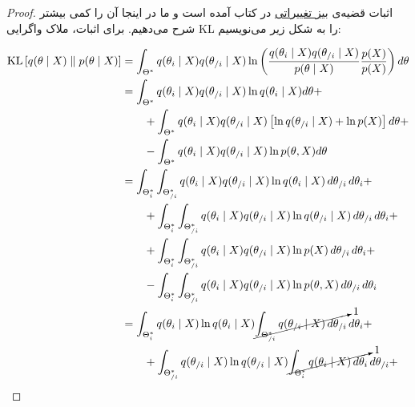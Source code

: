 \begin{proof}

اثبات قضیه‌ی
\hyperref[thm:VarBayeseTheorem]{بیز تغییراتی}
در کتاب
\cite{VBMethodsInSignal}
آمده است و ما در اینجا آن را کمی بیشتر شرح می‌دهیم. برای اثبات، ملاک واگرایی
KL
را به شکل زیر می‌نویسیم:


\allowdisplaybreaks
\begin{align*}
\KL{\AppCProb{\theta}{X}}{\TrueCProb{\theta}{X}}
&= \int_{\Theta^*} \AppCProb{\theta_i}{X} \AppCProb{\theta_{/i}}{X} \ln \left( \frac{
		\AppCProb{\theta_i}{X} \AppCProb{\theta_{/i}}{X}
	}{
		\TrueCProb{\theta}{X}
	} \frac{ \TrueProb{X} }{ \TrueProb{X} }
\right) d\theta																										\\
	&= \int_{\Theta^*} \AppCProb{\theta_i}{X} \AppCProb{\theta_{/i}}{X} \ln \AppCProb{\theta_i}{X} d\theta +		\\
		& \qquad + \int_{\Theta^*} \AppCProb{\theta_i}{X} \AppCProb{\theta_{/i}}{X} \left[
			\ln \AppCProb{\theta_{/i}}{X} + \ln \TrueProb{X}
		\right] d\theta +																							\\
		& \qquad - \int_{\Theta^*} \AppCProb{\theta_i}{X} \AppCProb{\theta_{/i}}{X} \ln \TrueProb{\theta, X} d\theta		\\
	&= \int_{\Theta_i^*} \int_{\Theta_{/i}^*}
		\AppCProb{\theta_i}{X} \AppCProb{\theta_{/i}}{X} \ln \AppCProb{\theta_i}{X}
	\,d\theta_{/i} \,d\theta_i +																					\\
		& \qquad + \int_{\Theta_i^*} \int_{\Theta_{/i}^*}
			\AppCProb{\theta_i}{X} \AppCProb{\theta_{/i}}{X} \ln \AppCProb{\theta_{/i}}{X}
		\,d\theta_{/i} \,d\theta_i +																				\\
		& \qquad + \int_{\Theta_i^*} \int_{\Theta_{/i}^*}
			\AppCProb{\theta_i}{X} \AppCProb{\theta_{/i}}{X} \ln \TrueProb{X}
		\,d\theta_{/i} \,d\theta_i +																				\\
		& \qquad - \int_{\Theta_i^*} \int_{\Theta_{/i}^*}
			\AppCProb{\theta_i}{X} \AppCProb{\theta_{/i}}{X} \ln \TrueProb{\theta, X}
		\,d\theta_{/i} \,d\theta_i																					\\
	&= \int_{\Theta_i^*} \AppCProb{\theta_i}{X} \ln \AppCProb{\theta_i}{X}
		\cancelto{1}{\int_{\Theta_{/i}^*} \AppCProb{\theta_{/i}}{X} \,d\theta_{/i}}
	\,d\theta_i +																									\\
		& \qquad + \int_{\Theta_{/i}^*} \AppCProb{\theta_{/i}}{X} \ln \AppCProb{\theta_{/i}}{X}
			\cancelto{1}{\int_{\Theta_i^*} \AppCProb{\theta_i}{X} \,d\theta_{i}}
		\,d\theta_{/i} +																							\\

\end{align*}
\end{proof}
